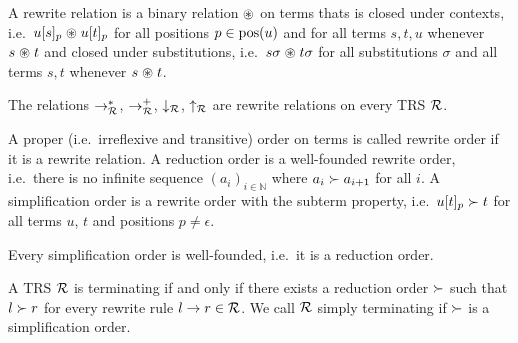 \begin{definition}\label{def:closed-under}
	A {\myem rewrite relation} is a binary relation $\mathrel{\circledast}$ on terms thats is {\myem closed under contexts},
	i.e.~$u[s]_p\mathrel{\circledast} u[t]_p$ %
	for all positions $p\in\operatorname{pos}(u)$ and
	for all terms $s,t,u$ whenever $s\mathrel{\circledast} t$
	and {\myem closed under substitutions}, 
	i.e.~$s\sigma\mathrel{\circledast} t\sigma$ %
	for all substitutions $\sigma$
	and all terms $s,t$ whenever $s\mathrel{\circledast} t$.
\end{definition}
\begin{lemma}
	The relations $\rightarrow^*_{\mathcal R}$, 
	$\rightarrow^+_{\mathcal R}$,
	$\downarrow_{\mathcal R}$, $\uparrow_{\mathcal R}$ are rewrite relations on every TRS ${\mathcal R}$.
\end{lemma}
%
\begin{definition}
	A proper (i.e.~irreflexive and transitive) order on terms is called {\myem rewrite order} if it is a rewrite relation.
	A {\myem reduction order} is a well-founded rewrite order,
	i.e.~there is no infinite sequence 
	$(a_i)_{i\in\mathbb{N}}$
	where $a_i\succ a_{i+1}$ for all $i$.
	A {\myem simplification order} is a rewrite order with the {\myem subterm property},
	i.e.~$u[t]_p \succ t$ for all terms $u$, $t$ and positions $p\neq\epsilon$.
\end{definition}
\begin{lemma}
	Every simplification order is well-founded, i.e.~it is a reduction order.
\end{lemma}
%
\begin{theorem}
	A TRS ${\mathcal R}$ is terminating if and only if there exists a reduction order $\succ$
	such that $l\succ r$ for every rewrite rule $l\rightarrow r\in{\mathcal R}$.
	We call ${\mathcal R}$ simply terminating if $\succ$ is a simplification order.
\end{theorem}
